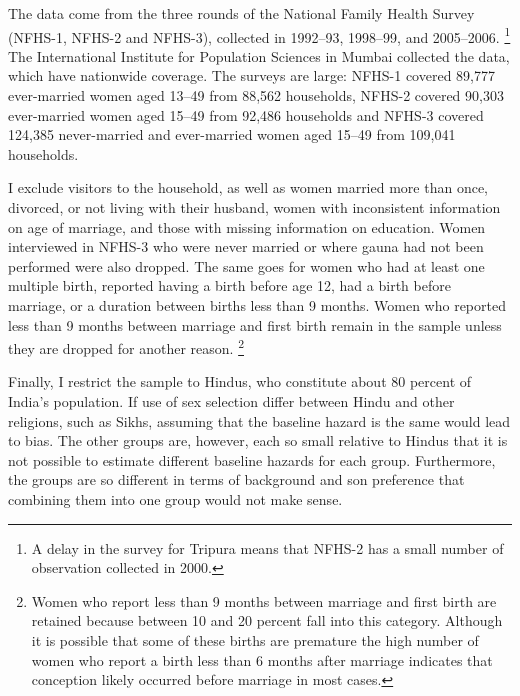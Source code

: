 \documentclass[12pt,letterpaper]{article}
\begin{document}
The data come from the three rounds of the National Family Health Survey 
(NFHS-1, NFHS-2 and NFHS-3),
collected in 1992--93, 1998--99, and 2005--2006.%
\footnote{
A delay in the survey for Tripura means that NFHS-2 has a small number of observation 
collected in 2000.
}
The International Institute for Population Sciences in Mumbai collected the data,
which have nationwide coverage.
The surveys are large: NFHS-1 covered 89,777 ever-married women 
aged 13--49 from 88,562 households,
NFHS-2 covered 90,303 ever-married women aged 15--49 from 92,486 households
and NFHS-3 covered 124,385 never-married and ever-married women aged 
15--49 from 109,041 households.

I exclude visitors to the household, as well as
women married more than once, divorced, or not living with their husband,
women with inconsistent information on age of marriage,
and those with missing information on education.
Women interviewed in NFHS-3 who were never married or where gauna had not
been performed were also dropped.
The same goes for women who had at least one multiple birth,
reported having a birth before age 12, had a birth before marriage, or
a duration between births less than 9 months.
Women who reported less than 9 months between marriage and first birth
remain in the sample unless they are dropped for another reason.%
\footnote{
Women who report less than 9 months between marriage and first birth are retained 
because between 10 and 20 percent fall into this category.
Although it is possible that some of these births are premature the high number of
women who report a birth less than 6 months after marriage indicates that conception
likely occurred before marriage in most cases.
}

Finally, I restrict the sample to Hindus,
who constitute about 80 percent of India's population.
If use of sex selection differ between Hindu and other religions, such 
as Sikhs, assuming that the baseline hazard is the same would lead to bias.
The other groups are, however, each so small relative to Hindus that it is not
possible to estimate different baseline hazards for each group.
Furthermore, the groups are so different in terms of background and son preference
that combining them into one group would not make sense.
\end{document}
